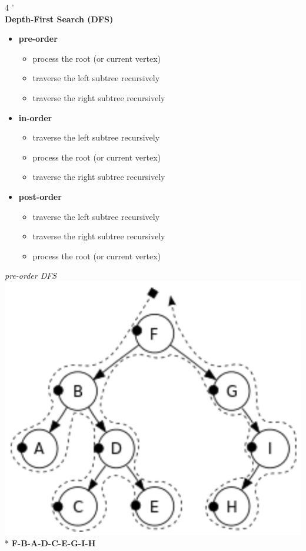 \documentclass[10pt, landscape]{article}
\begin{document}
\begin{multicols}{4
    '}
\ 
\\ \textbf{Depth-First Search (DFS)}
\begin{itemize}
    \item \textbf{pre-order}
    \begin{itemize}
        \item process the root (or current vertex)
        \item traverse the left subtree recursively
        \item traverse the right subtree recursively
    \end{itemize}
    \item \textbf{in-order}
    \begin{itemize}
        \item traverse the left subtree recursively
        \item process the root (or current vertex)
        \item traverse the right subtree recursively
    \end{itemize}
    \item \textbf{post-order}
    \begin{itemize}
        \item traverse the left subtree recursively
        \item traverse the right subtree recursively
        \item process the root (or current vertex)
    \end{itemize}
\end{itemize}
\begin{center}
    \begin{multicols}{3}
        \textit{pre-order DFS}
        \includegraphics[width=0.9\linewidth]{cs1231s-ch11-preorder}
        \\* {\tiny\textbf{F-B-A-D-C-E-G-I-H}}
        

\end{multicols}
\end{center}
\end{multicols}
\end{document}
